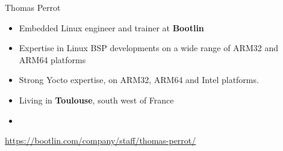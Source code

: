 \begin{frame}{Thomas Perrot}
  \begin{itemize}
  \item Embedded Linux engineer and trainer at {\bf Bootlin}
  \item Expertise in Linux BSP developments on a wide range of ARM32
    and ARM64 platforms
  \item Strong Yocto expertise, on ARM32, ARM64 and Intel platforms.
  \item Living in {\bf Toulouse}, south west of France
  \item {}
  \end{itemize}
  {\small \url{https://bootlin.com/company/staff/thomas-perrot/}}
\end{frame}

